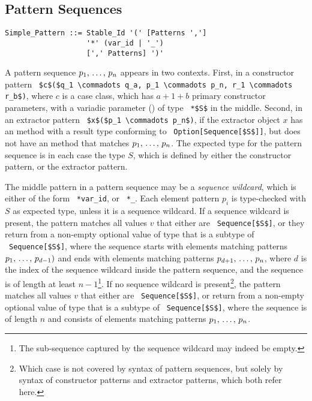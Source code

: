 \subsection{Pattern Sequences}
\label{sec:pattern-sequences}

\syntax\begin{lstlisting}
Simple_Pattern ::= Stable_Id '(' [Patterns ','] 
                   '*' (var_id | '_')
                   [',' Patterns] ')'
\end{lstlisting}

A pattern sequence $p_1 ,\, \ldots ,\, p_n$ appears in two contexts. First, in a constructor pattern ~\lstinline!$c$($q_1 \commadots q_a, p_1 \commadots p_n, r_1 \commadots r_b$)!, where $c$ is a case class, which has $a+1+b$ primary constructor parameters, with a variadic parameter () of type ~\lstinline!*$S$! in the middle. Second, in an extractor pattern ~\lstinline!$x$($p_1 \commadots p_n$)!, if the extractor object $x$ has an  method with a result type conforming to ~\lstinline!Option[Sequence[$S$]]!, but does not have an  method that matches $p_1 ,\, \ldots ,\, p_n$. The expected type for the pattern sequence is in each case the type $S$, which is defined by either the constructor pattern, or the extractor pattern. 

The middle pattern in a pattern sequence may be a {\em sequence wildcard}, which is either of the form ~\lstinline!*var_id!, or ~\lstinline!*_!. Each element pattern $p_i$ is type-checked with $S$ as expected type, unless it is a sequence wildcard. If a sequence wildcard is present, the pattern matches all values $v$ that either are ~\lstinline!Sequence[$S$]!, or they return from  a non-empty optional value of type that is a subtype of ~\lstinline!Sequence[$S$]!, where the sequence starts with elements matching patterns $p_1 ,\, \ldots ,\, p_{d-1})$ and ends with elements matching patterns $p_{d+1} ,\, \ldots ,\, p_n$, where $d$ is the index of the sequence wildcard inside the pattern sequence, and the sequence is of length at least $n-1$\footnote{The sub-sequence captured by the sequence wildcard may indeed be empty.}. If no sequence wildcard is present\footnote{Which case is not covered by syntax of pattern sequences, but solely by syntax of constructor patterns and extractor patterns, which both refer here.}, the pattern matches all values $v$ that either are ~\lstinline!Sequence[$S$]!, or return from  a non-empty optional value of type that is a subtype of ~\lstinline!Sequence[$S$]!, where the sequence is of length $n$ and consists of elements matching patterns $p_1 ,\, \ldots ,\, p_n$. 

